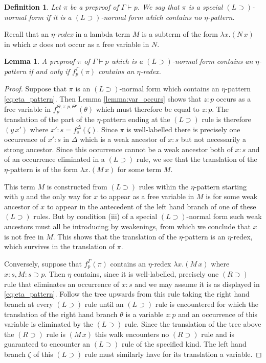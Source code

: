 \documentclass[english,letter paper,12pt,leqno]{article}
\newtheorem{lemma}[theorem]{Lemma}
\theoremstyle{example}
\newtheorem{definition}[theorem]{Definition}
\numberwithin{equation}{section}
\def\imp{\supset}
\begin{document}
\begin{definition}\label{defn:special_l_normal} Let $\pi$ be a preproof of $\Gamma \vdash p$. We say that $\pi$ is a \emph{special $(L \imp)$-normal form} if it is a $(L \imp)$-normal form which contains no $\eta$-pattern.
\end{definition}

Recall that an \emph{$\eta$-redex} in a lambda term $M$ is a subterm of the form $\lambda x. (N \, x)$ in which $x$ does not occur as a free variable in $N$.

\begin{lemma}\label{lemma:etapattern_implies_redex} A preproof $\pi$ of $\Gamma \vdash p$ which is a $(L \imp)$-normal form contains an $\eta$-pattern if and only if $f^\Gamma_p(\pi)$ contains an $\eta$-redex.
\end{lemma}
\begin{proof}
Suppose that $\pi$ is an $(L \imp)$-normal form which contains an $\eta$-pattern \eqref{eq:eta_pattern}. Then Lemma \ref{lemma:var_occurs} shows that $z:p$ occurs as a free variable in $f^{\Theta,z:p,\Theta'}_p(\theta)$ which must therefore be equal to $z:p$. The translation of the part of the $\eta$-pattern ending at the $(L \imp)$ rule is therefore $(y \, x')$ where $x':s = f^{\Delta}_s(\zeta)$. Since $\pi$ is well-labelled there is precisely one occurrence of $x':s$ in $\Delta$ which is a weak ancestor of $x:s$ but not necessarily a strong ancestor. Since this occurrence cannot be a weak ancestor both of $x:s$ and of an occurrence eliminated in a $(L \imp)$ rule, we see that the translation of the $\eta$-pattern is of the form $\lambda x . (M \, x)$ for some term $M$. 

This term $M$ is constructed from $(L \imp)$ rules within the $\eta$-pattern starting with $y$ and the only way for $x$ to appear as a free variable in $M$ is for some weak ancestor of $x$ to appear in the antecedent of the left hand branch of one of these $(L \imp)$ rules. But by condition (iii) of a special $(L \imp)$-normal form such weak ancestors must all be introducing by weakenings, from which we conclude that $x$ is not free in $M$. This shows that the translation of the $\eta$-pattern is an $\eta$-redex, which survives in the translation of $\pi$.

Conversely, suppose that $f^\Gamma_p(\pi)$ contains an $\eta$-redex $\lambda x. (M \, x)$ where $x:s, M:s \imp p$. Then $\eta$ contains, since it is well-labelled, precisely one $(R \imp)$ rule that eliminates an occurrence of $x:s$ and we may assume it is as displayed in \eqref{eq:eta_pattern}. Follow the tree upwards from this rule taking the right hand branch at every $(L \imp)$ rule until an $(L \imp)$ rule is encountered for which the translation of the right hand branch $\theta$ is a variable $z:p$ and an occurrence of this variable is eliminated by the $(L \imp)$ rule. Since the translation of the tree above the $(R \imp)$ rule is $(M \, x)$ this walk encounters no $(R \imp)$ rule and is guaranteed to encounter an $(L \imp)$ rule of the specified kind. The left hand branch $\zeta$ of this $(L \imp)$ rule must similarly have for its translation a variable.


\end{proof}
\end{document}
